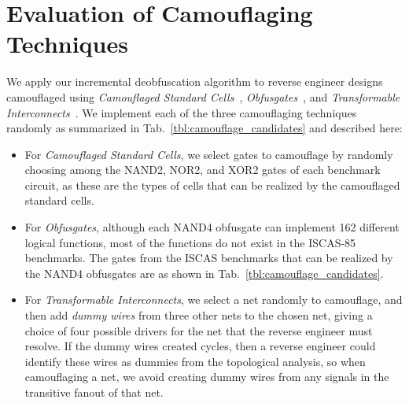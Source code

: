 \documentclass[proposal]{umassthesis}  %
\begin{document}
\section{Evaluation of Camouflaging Techniques}
We apply our incremental deobfuscation algorithm to reverse engineer designs camouflaged using \textit{Camouflaged Standard Cells}~\cite{rajendran-13}, \textit{Obfusgates}~\cite{malik-obfusgate}, and \textit{Transformable Interconnects}~\cite{chen-2015-dummyWire}. We implement each of the three camouflaging techniques randomly as summarized in Tab.~\ref{tbl:camouflage_candidates} and described here: 
\begin{itemize}

\item For \textit{Camouflaged Standard Cells}, we select {gates to camouflage by randomly choosing among the } NAND2, NOR2, and XOR2 gates of each benchmark circuit, as these are the types of cells that can be realized by the camouflaged standard cells.

\item For \textit{Obfusgates}, although each NAND4 obfusgate can implement 162 different logical functions, most of the functions do not exist in the ISCAS-85 benchmarks. The gates from the ISCAS benchmarks that can be realized by the NAND4 obfusgates are as shown in Tab.~\ref{tbl:camouflage_candidates}.

\item For \textit{Transformable Interconnects}, we select a net randomly to camouflage, and then add \textit{dummy wires} from three other nets to the chosen net, giving a choice of four possible drivers for the net that the reverse engineer must resolve. If the dummy wires created cycles, then a reverse engineer could identify these wires as dummies from the topological analysis, so when camouflaging a net, we avoid creating dummy wires from any signals in the transitive fanout of that net. 

\end{itemize}
\end{document}
